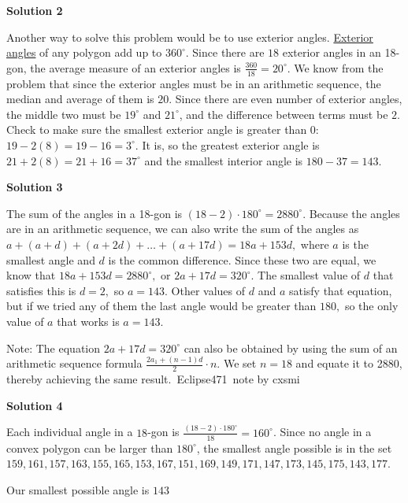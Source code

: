 \begin{enumerate}
\textbf{Solution 2}

Another way to solve this problem would be to use exterior angles. \href{https://artofproblemsolving.com/wiki/index.php?title=Exterior\_angle}{Exterior angles} of any polygon add up to $360^{\circ}$. Since there are $18$ exterior angles in an 18-gon, the average measure of an exterior angles is $\frac{360}{18}=20^\circ$. We know from the problem that since the exterior angles must be in an arithmetic sequence, the median and average of them is $20$. Since there are even number of exterior angles, the middle two must be $19^\circ$ and $21^\circ$, and the difference between terms must be $2$. Check to make sure the smallest exterior angle is greater than $0$: $19-2(8)=19-16=3^\circ$. It is, so the greatest exterior angle is $21+2(8)=21+16=37^\circ$ and the smallest interior angle is $180-37=\boxed{143}$.

 



\textbf{Solution 3}

The sum of the angles in a 18-gon is $(18-2) \cdot 180^\circ = 2880 ^\circ.$ Because the angles are in an arithmetic sequence, we can also write the sum of the angles as $a+(a+d)+(a+2d)+\dots+(a+17d)=18a+153d,$ where $a$ is the smallest angle and $d$ is the common difference. Since these two are equal, we know that $18a+153d = 2880 ^\circ,$ or $2a+17d = 320^\circ.$ The smallest value of $d$ that satisfies this is $d=2,$ so $a=143.$ Other values of $d$ and $a$ satisfy that equation, but if we tried any of them the last angle would be greater than $180,$ so the only value of $a$ that works is $a=\boxed{143}$.

 Note: The equation $2a+17d = 320^\circ$ can also be obtained by using the sum of an arithmetic sequence formula $\frac{2a_1+(n-1)d}{2} \cdot n$. We set $n = 18$ and equate it to 2880, thereby achieving the same result.~Eclipse471~note by cxsmi

 



\textbf{Solution 4}

Each individual angle in a $18$-gon is $\frac {(18-2) \cdot 180^\circ}{18} = 160^\circ$. Since no angle in a convex polygon can be larger than $180^\circ$, the smallest angle possible is in the set $159, 161, 157, 163, 155, 165, 153, 167, 151, 169, 149, 171, 147, 173, 145, 175, 143, 177$. 

 Our smallest possible angle is $\boxed {143}$





\end{enumerate}
